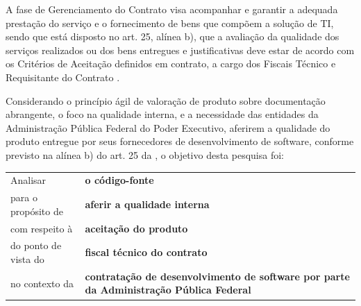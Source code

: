 A fase de Gerenciamento do Contrato visa acompanhar e garantir a adequada prestação do serviço e o fornecimento de bens que compõem a solução de TI, sendo que está disposto no art. 25, alínea b), que a avaliação da qualidade dos serviços realizados ou dos bens entregues e justificativas deve estar de acordo com os Critérios de Aceitação definidos em contrato, a cargo dos Fiscais Técnico e Requisitante do Contrato \cite{IN04:2010}.

Considerando o princípio ágil de valoração de produto sobre documentação abrangente, o foco na qualidade interna, e a necessidade das entidades da Administração Pública Federal do Poder Executivo, aferirem a qualidade do produto entregue por seus fornecedores de desenvolvimento de software, conforme previsto na alínea b) do art. 25 da \cite{IN04:2010}, o objetivo desta pesquisa foi:


\begin{tabular}{p{3.5cm}p{8cm}}
Analisar & \textbf{o código-fonte} \\
para o propósito  de & \textbf{aferir a qualidade interna} \\
com respeito à & \textbf{aceitação do produto} \\
do ponto de vista do & \textbf{fiscal técnico do contrato} \\
no contexto da & \textbf{contratação de desenvolvimento de software por parte da Administração Pública Federal} \\
\end{tabular}
